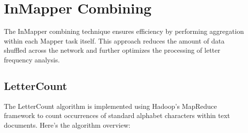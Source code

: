 \newpage



\section{InMapper Combining}
The InMapper combining technique ensures efficiency by performing aggregation within each Mapper task itself. This approach reduces the amount of data shuffled across the network and further optimizes the processing of letter frequency analysis.


\subsection{LetterCount}

The LetterCount algorithm is implemented using Hadoop's MapReduce framework to count occurrences of standard alphabet characters within text documents. Here’s the algorithm overview:

